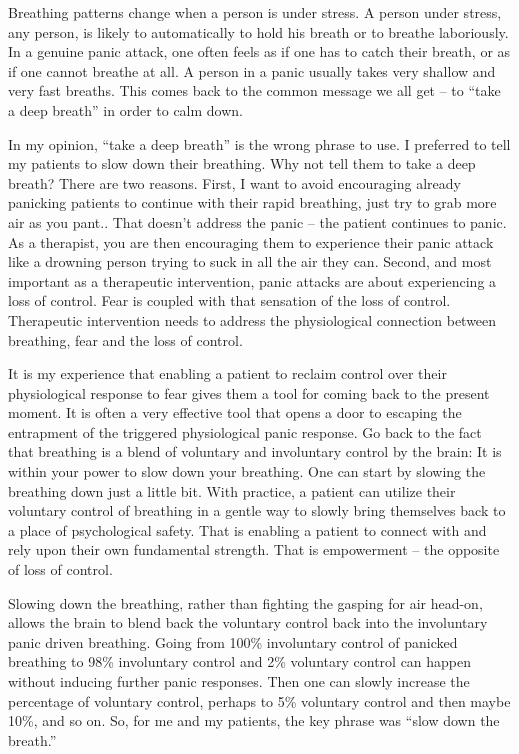 \documentclass[]{book}
\begin{document}
Breathing patterns change when a person is under stress. A person under stress, any person, is likely to automatically to hold his breath or to breathe laboriously. In a genuine panic attack, one often feels as if one has to catch their breath, or as if one cannot breathe at all. A person in a panic usually takes very shallow and very fast breaths. This comes back to the common message we all get -- to ``take a deep breath'' in order to calm down.

In my opinion, ``take a deep breath'' is the wrong phrase to use. I preferred to tell my patients to slow down their breathing. Why not tell them to take a deep breath? There are two reasons. First, I want to avoid encouraging already panicking patients to continue with their rapid breathing, just try to grab more air as you pant.. That doesn't address the panic -- the patient continues to panic. As a therapist, you are then encouraging them to experience their panic attack like a drowning person trying to suck in all the air they can. Second, and most important as a therapeutic intervention, panic attacks are about experiencing a loss of control. Fear is coupled with that sensation of the loss of control. Therapeutic intervention needs to address the physiological connection between breathing, fear and the loss of control.

It is my experience that enabling a patient to reclaim control over their physiological response to fear gives them a tool for coming back to the present moment. It is often a very effective tool that opens a door to escaping the entrapment of the triggered physiological panic response. Go back to the fact that breathing is a blend of voluntary and involuntary control by the brain: It is within your power to slow down your breathing. One can start by slowing the breathing down just a little bit. With practice, a patient can utilize their voluntary control of breathing in a gentle way to slowly bring themselves back to a place of psychological safety. That is enabling a patient to connect with and rely upon their own fundamental strength. That is empowerment -- the opposite of loss of control.

Slowing down the breathing, rather than fighting the gasping for air head-on, allows the brain to blend back the voluntary control back into the involuntary panic driven breathing. Going from 100\% involuntary control of panicked breathing to 98\% involuntary control and 2\% voluntary control can happen without inducing further panic responses. Then one can slowly increase the percentage of voluntary control, perhaps to 5\% voluntary control and then maybe 10\%, and so on. So, for me and my patients, the key phrase was ``slow down the breath.''
\end{document}
